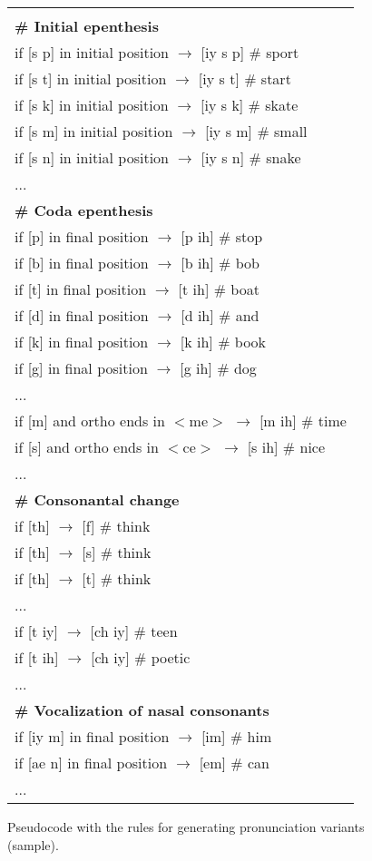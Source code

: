 \documentclass[twocolumn]{bmcart}%
\begin{document}
\begin{figure}[!ht]
  \caption{
      Pseudocode with the rules for generating pronunciation variants (sample).}
      \label{pseudocode-rules}
\small
\begin{tabular}{l} \hline
\small
\\ 
\textbf{\# Initial epenthesis} \\
if [s p] in initial position $\rightarrow$ [iy s p] \# sport \\
if [s t] in initial position $\rightarrow$ [iy s t] \# start \\
if [s k] in initial position $\rightarrow$ [iy s k] \# skate \\
if [s m] in initial position $\rightarrow$ [iy s m] \# small \\
if [s n] in initial position $\rightarrow$ [iy s n] \# snake \\
 ...  \\
\textbf{\# Coda epenthesis} \\
if [p] in final position $\rightarrow$ [p ih] \# stop \\
if [b] in final position $\rightarrow$ [b ih] \# bob \\
if [t] in final position $\rightarrow$ [t ih] \# boat \\
if [d] in final position $\rightarrow$ [d ih] \# and \\ 
if [k] in final position $\rightarrow$ [k ih] \# book \\
if [g] in final position $\rightarrow$ [g ih] \# dog \\
 ...  \\
if [m] and ortho ends in $<$me$>$ $\rightarrow$ [m ih] \# time \\
if [s] and ortho ends in $<$ce$>$ $\rightarrow$ [s ih] \# nice \\
 ...  \\
\textbf{\# Consonantal change} \\
if [th] $\rightarrow$ [f] \# think \\
if [th] $\rightarrow$ [s] \# think \\
if [th] $\rightarrow$ [t] \# think \\
... \\
if [t iy] $\rightarrow$ [ch iy] \# teen \\
if [t ih] $\rightarrow$ [ch iy] \# poetic \\
 ... \\
\textbf{\# Vocalization of nasal consonants} \\
if [iy m] in final position $\rightarrow$ [im] \# him \\
if [ae n] in final position $\rightarrow$ [em] \# can \\
... \\
\end{tabular}
\end{figure}
\end{document}
